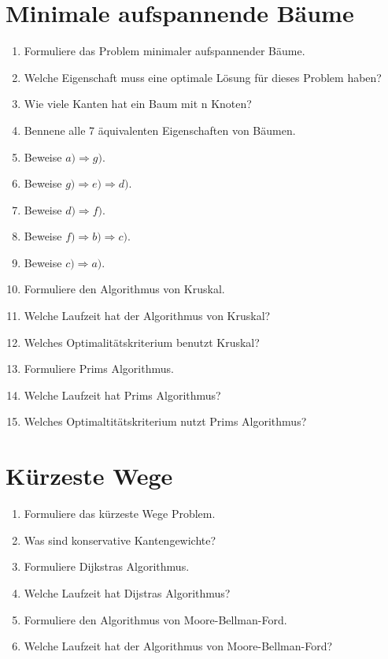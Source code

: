 \documentclass[a4paper,10pt]{scrreprt}
\begin{document}
	\section{Minimale aufspannende Bäume}
	\begin{enumerate}
		\item Formuliere das Problem minimaler aufspannender Bäume.
		\item Welche Eigenschaft muss eine optimale Lösung für dieses Problem haben?
		\item Wie viele Kanten hat ein Baum mit n Knoten?
		\item Bennene alle 7 äquivalenten Eigenschaften von Bäumen.
		\item Beweise $a)\Rightarrow g)$.
		\item Beweise $g) \Rightarrow e) \Rightarrow d)$.
		\item Beweise $d) \Rightarrow f)$.
		\item Beweise $f) \Rightarrow b) \Rightarrow c)$.
		\item Beweise $c) \Rightarrow a)$.
		\item Formuliere den Algorithmus von Kruskal.
		\item Welche Laufzeit hat der Algorithmus von Kruskal?
		\item Welches Optimalitätskriterium benutzt Kruskal?
		\item Formuliere Prims Algorithmus.
		\item Welche Laufzeit hat Prims Algorithmus?
		\item Welches Optimaltitätskriterium nutzt Prims Algorithmus?
	\end{enumerate}
	\section{Kürzeste Wege}
	\begin{enumerate}
		\item Formuliere das kürzeste Wege Problem.
		\item Was sind konservative Kantengewichte?
		\item Formuliere Dijkstras Algorithmus.
		\item Welche Laufzeit hat Dijstras Algorithmus?
		\item Formuliere den Algorithmus von Moore-Bellman-Ford.
		\item Welche Laufzeit hat der Algorithmus von Moore-Bellman-Ford?
	\end{enumerate}
\end{document}
